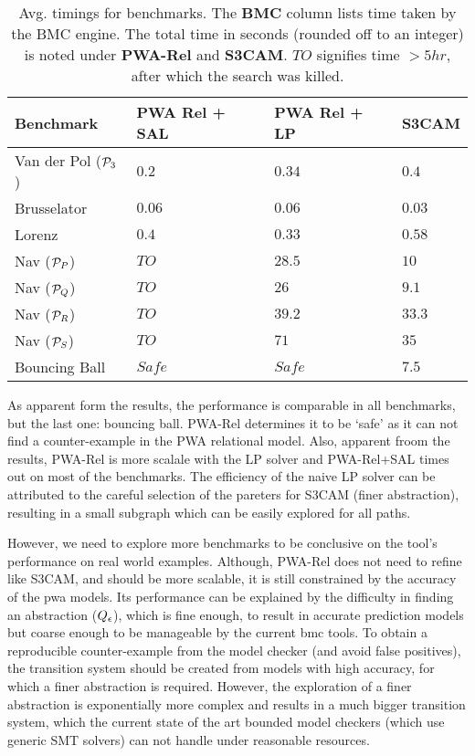 \begin{table}[!htbp]
\centering
\caption{Avg. timings for benchmarks. The \textbf{BMC} column lists
time taken by the BMC engine. The total time in seconds (rounded off
to an integer) is noted under \textbf{PWA-Rel} and \textbf{S3CAM}.
$TO$ signifies time $>5hr$, after which the search was killed.}
\label{tab:res-rel}
\begin{tabular}{@{}llll@{}}
\toprule
    Benchmark & PWA Rel + SAL & PWA Rel + LP & S3CAM\\
\midrule
    Van der Pol ($\mathcal{P}_3$)   &$0.2$ & $0.34$ & $0.4$\\
    Brusselator               &$0.06$ & $0.06$ & $0.03$\\
    Lorenz                    &$0.4$ & $0.33$ & $0.58$\\
    Nav ($\mathcal{P}_P$)           &$TO$ & $28.5$  & $10$ \\%
    Nav ($\mathcal{P}_Q$)           &$TO$ & $26$   & $9.1$ \\%
    Nav ($\mathcal{P}_R$)           &$TO$ & $39.2$  & $33.3$\\
    Nav ($\mathcal{P}_S$)           &$TO$ & $71$  & $35$\\
    Bouncing Ball             &$Safe$ & $Safe$  & $7.5$\\

\bottomrule
\end{tabular}
\end{table}


As apparent form the results, the performance is comparable in all
benchmarks, but the last one: bouncing ball. PWA-Rel determines it to
be `safe' as it can not find a counter-example in the PWA relational
model. Also, apparent froom the results, PWA-Rel is more scalale with
the LP solver and PWA-Rel+SAL times out on most of the benchmarks.
The efficiency of the naive LP solver can be attributed to the careful
selection of the pareters for S3CAM (finer abstraction), resulting in
a small subgraph which can be easily explored for all paths.

However, we need to explore more benchmarks to be conclusive on the
tool's performance on real world examples. Although, PWA-Rel does not
need to refine like S3CAM, and should be more scalable, it is still
constrained by the accuracy of the pwa models. Its performance can be
explained by the difficulty in finding an abstraction
($Q_\epsilon$), which is fine enough, to result in accurate
prediction models but coarse enough to be manageable by the current
bmc tools.  To obtain a reproducible counter-example from the model
checker (and avoid false positives), the transition system should be
created from models with high accuracy, for which a finer abstraction
is required.  However, the exploration of a finer abstraction is
exponentially more complex and results in a much bigger transition
system, which the current state of the art bounded model checkers
(which use generic SMT solvers) can not handle under reasonable
resources.
